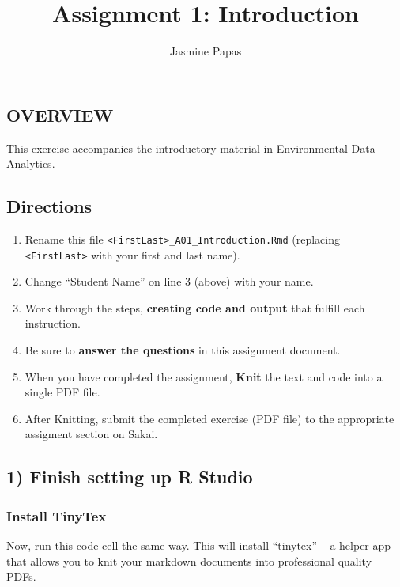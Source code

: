 \documentclass[
]{article}
\title{Assignment 1: Introduction}
\author{Jasmine Papas}
\date{}
\providecommand{\tightlist}{%
  \setlength{\itemsep}{0pt}\setlength{\parskip}{0pt}}
\begin{document}
\maketitle

\hypertarget{overview}{%
\subsection{OVERVIEW}\label{overview}}

This exercise accompanies the introductory material in Environmental
Data Analytics.

\hypertarget{directions}{%
\subsection{Directions}\label{directions}}

\begin{enumerate}
\def\labelenumi{\arabic{enumi}.}
\tightlist
\item
  Rename this file
  \texttt{\textless{}FirstLast\textgreater{}\_A01\_Introduction.Rmd}
  (replacing \texttt{\textless{}FirstLast\textgreater{}} with your first
  and last name).
\item
  Change ``Student Name'' on line 3 (above) with your name.
\item
  Work through the steps, \textbf{creating code and output} that fulfill
  each instruction.
\item
  Be sure to \textbf{answer the questions} in this assignment document.
\item
  When you have completed the assignment, \textbf{Knit} the text and
  code into a single PDF file.
\item
  After Knitting, submit the completed exercise (PDF file) to the
  appropriate assigment section on Sakai.
\end{enumerate}

\hypertarget{finish-setting-up-r-studio}{%
\subsection{1) Finish setting up R
Studio}\label{finish-setting-up-r-studio}}

\hypertarget{install-tinytex}{%
\subsubsection{Install TinyTex}\label{install-tinytex}}

Now, run this code cell the same way. This will install ``tinytex'' -- a
helper app that allows you to knit your markdown documents into
professional quality PDFs.
\end{document}
